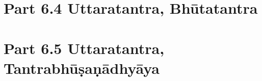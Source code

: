 \documentclass[12pt,
    ]{book}
\begin{document}
        
     \thispagestyle{empty}
     
     \part{Part 6.4 Uttaratantra, Bhūtatantra} %
  
      
            \thispagestyle{empty}
            
    \part{Part 6.5 Uttaratantra, Tantrabhūṣaṇādhyāya} %

            \thispagestyle{empty}

            \thispagestyle{empty}
        
        
            \thispagestyle{empty}
%        
        

        \listoftodos  %

        \newpage
        \thispagestyle {empty}
        \pagecolor{cyan} %
        \ %
\end{document}
